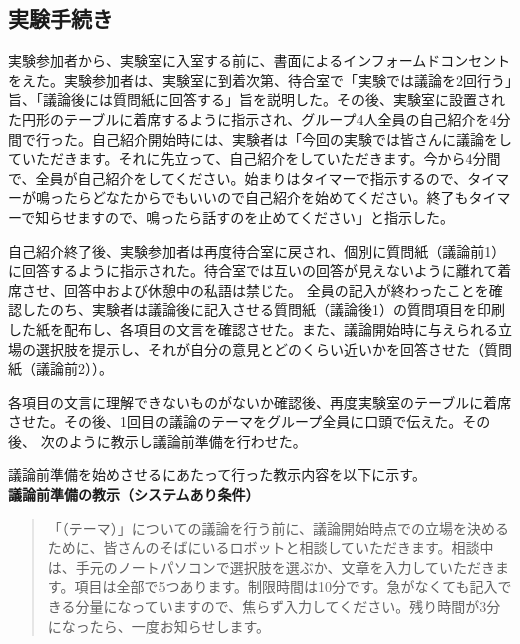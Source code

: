 \documentclass[11pt, a4paper]{jreport} %
\begin{document}
\subsection{実験手続き}
実験参加者から、実験室に入室する前に、書面によるインフォームドコンセントをえた。実験参加者は、実験室に到着次第、待合室で「実験では議論を2回行う」旨、「議論後には質問紙に回答する」旨を説明した。その後、実験室に設置された円形のテーブルに着席するように指示され、グループ4人全員の自己紹介を4分間で行った。自己紹介開始時には、実験者は「今回の実験では皆さんに議論をしていただきます。それに先立って、自己紹介をしていただきます。今から4分間で、全員が自己紹介をしてください。始まりはタイマーで指示するので、タイマーが鳴ったらどなたからでもいいので自己紹介を始めてください。終了もタイマーで知らせますので、鳴ったら話すのを止めてください」と指示した。


自己紹介終了後、実験参加者は再度待合室に戻され、個別に質問紙（議論前1）に回答するように指示された。待合室では互いの回答が見えないように離れて着席させ、回答中および休憩中の私語は禁じた。
全員の記入が終わったことを確認したのち、実験者は議論後に記入させる質問紙（議論後1）の質問項目を印刷した紙を配布し、各項目の文言を確認させた。また、議論開始時に与えられる立場の選択肢を提示し、それが自分の意見とどのくらい近いかを回答させた（質問紙（議論前2））。

各項目の文言に理解できないものがないか確認後、再度実験室のテーブルに着席させた。その後、1回目の議論のテーマをグループ全員に口頭で伝えた。その後、
次のように教示し議論前準備を行わせた。



議論前準備を始めさせるにあたって行った教示内容を以下に示す。\\

\textbf{議論前準備の教示（システムあり条件）}
\begin{quote}
「（テーマ）」についての議論を行う前に、議論開始時点での立場を決めるために、皆さんのそばにいるロボットと相談していただきます。相談中は、手元のノートパソコンで選択肢を選ぶか、文章を入力していただきます。項目は全部で5つあります。制限時間は10分です。急がなくても記入できる分量になっていますので、焦らず入力してください。残り時間が3分になったら、一度お知らせします。
\end{quote}
\end{document}
